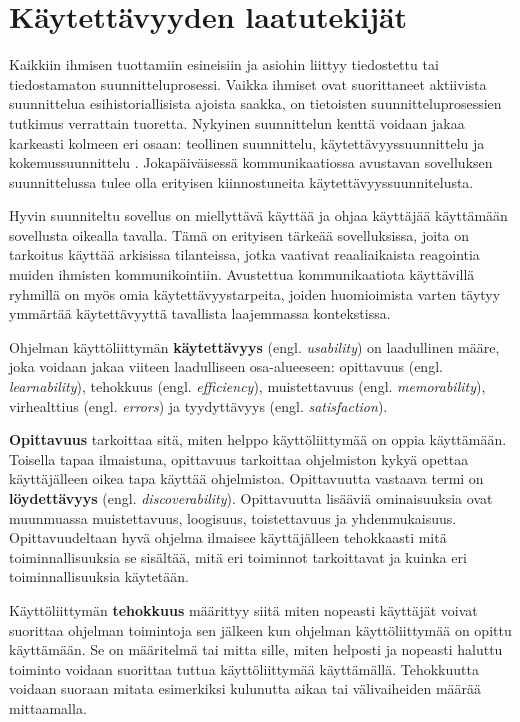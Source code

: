\documentclass[utf8]{gradu3}
\begin{document}
\section{Käytettävyyden laatutekijät}

Kaikkiin ihmisen tuottamiin esineisiin ja asiohin liittyy tiedostettu tai tiedostamaton suunnitteluprosessi. Vaikka ihmiset ovat suorittaneet aktiivista suunnittelua esihistoriallisista ajoista saakka, on tietoisten suunnitteluprosessien tutkimus verrattain tuoretta. Nykyinen suunnittelun kenttä voidaan jakaa karkeasti kolmeen eri osaan: teollinen suunnittelu, käytettävyyssuunnittelu ja kokemussuunnittelu \parencite[]{norman-doet}. Jokapäiväisessä kommunikaatiossa avustavan sovelluksen suunnittelussa tulee olla erityisen kiinnostuneita käytettävyyssuunnitelusta.

Hyvin suunniteltu sovellus on miellyttävä käyttää ja ohjaa käyttäjää käyttämään sovellusta oikealla tavalla. Tämä on erityisen tärkeää sovelluksissa, joita on tarkoitus käyttää arkisissa tilanteissa, jotka vaativat reaaliaikaista reagointia muiden ihmisten kommunikointiin. Avustettua kommunikaatiota käyttävillä ryhmillä on myös omia käytettävyystarpeita, joiden huomioimista varten täytyy ymmärtää käytettävyyttä tavallista laajemmassa kontekstissa.

\label{general-usability-requirements}
Ohjelman käyttöliittymän \textbf{käytettävyys} (engl. \textit{usability}) on laadullinen määre, joka voidaan jakaa viiteen laadulliseen osa-alueeseen: opittavuus (engl. \textit{learnability}), tehokkuus (engl. \textit{efficiency}), muistettavuus (engl. \textit{memorability}), virhealttius (engl. \textit{errors}) ja tyydyttävyys (engl. \textit{satisfaction}). \parencite[]{usability-101}

\textbf{Opittavuus} tarkoittaa sitä, miten helppo käyttöliittymää on oppia käyttämään. Toisella tapaa ilmaistuna, opittavuus tarkoittaa ohjelmiston kykyä opettaa käyttäjälleen oikea tapa käyttää ohjelmistoa. Opittavuutta vastaava termi on \textbf{löydettävyys} (engl. \textit{discoverability}). Opittavuutta lisääviä ominaisuuksia ovat muunmuassa muistettavuus, loogisuus, toistettavuus ja yhdenmukaisuus. Opittavuudeltaan hyvä ohjelma ilmaisee käyttäjälleen tehokkaasti mitä toiminnallisuuksia se sisältää, mitä eri toiminnot tarkoittavat ja kuinka eri toiminnallisuuksia käytetään. \parencite[]{improving-learnability}

Käyttöliittymän \textbf{tehokkuus} määrittyy siitä miten nopeasti käyttäjät voivat suorittaa ohjelman toimintoja sen jälkeen kun ohjelman käyttöliittymää on opittu käyttämään. Se on määritelmä tai mitta sille, miten helposti ja nopeasti haluttu toiminto voidaan suorittaa tuttua käyttöliittymää käyttämällä. Tehokkuutta voidaan suoraan mitata esimerkiksi kulunutta aikaa tai välivaiheiden määrää mittaamalla.
\end{document}
